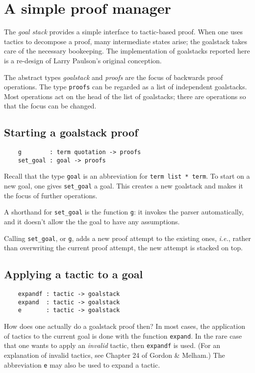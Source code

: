 \documentclass[12pt,fleqn,a4paper]{report}
\begin{document}
\section{A simple proof manager}\label{goalstack}

The {\it goal stack\/} provides a simple interface to tactic-based
proof. When one uses tactics to decompose a proof, many intermediate
states arise; the goalstack takes care of the necessary bookeeping. The
implementation of goalstacks reported here is a re-design of Larry
Paulson's original conception.

The abstract types {\it goalstack\/} and {\it proofs\/} are the focus of
backwards proof operations. The type \verb+proofs+ can be regarded as a
list of independent goalstacks. Most operations act on the head of the
list of goalstacks; there are operations so that the focus can
be changed.

\subsection{Starting a goalstack proof}

\begin{verbatim}
    g        : term quotation -> proofs
    set_goal : goal -> proofs
\end{verbatim}

Recall that the type \verb+goal+ is an abbreviation for
\verb+term list * term+. To start on a new goal, one gives
\verb+set_goal+ a goal. This creates a new goalstack and makes it the
focus of further operations.

A shorthand for \verb+set_goal+ is the function \verb+g+: it
invokes the parser automatically, and it doesn't allow the the goal to
have any assumptions.


Calling \verb+set_goal+, or \verb+g+, adds a new proof attempt to
the existing ones, {\it i.e.}, rather than overwriting the current
proof attempt, the new attempt is stacked on top.

\subsection{Applying a tactic to a goal}

\begin{verbatim}
    expandf : tactic -> goalstack
    expand  : tactic -> goalstack
    e       : tactic -> goalstack
\end{verbatim}

How does one actually do a goalstack proof then? In most cases, the
application of tactics to the current goal is done with the function
\verb+expand+. In the rare case that one wants to apply an
{\it invalid\/} tactic, then \verb+expandf+ is used. (For an
explanation of invalid tactics, see Chapter 24 of Gordon \& Melham.) The
abbreviation \verb+e+ may also be used to expand a tactic.
\end{document}
